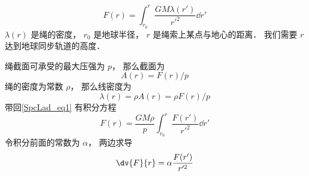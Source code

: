 
\begin{equation}\label{SpcLad_eq1}
F(r) = \int_{r_0}^{r} \frac{GM\lambda(r')}{r'^2} \dd{r'}
\end{equation}
$\lambda(r)$ 是绳的密度， $r_0$ 是地球半径， $r$ 是绳索上某点与地心的距离． 我们需要 $r$ 达到地球同步轨道的高度．

绳截面可承受的最大压强为 $p$， 那么截面为
\begin{equation}
A(r) = F(r)/p
\end{equation}
绳的密度为常数 $\rho$， 那么线密度为
\begin{equation}
\lambda(r) = \rho A(r) = \rho F(r)/p
\end{equation}
带回\autoref{SpcLad_eq1} 有积分方程
\begin{equation}
F(r) = \frac{GM\rho}{p} \int_{r_0}^{r} \frac{F(r')}{r'^2} \dd{r'}
\end{equation}
令积分前面的常数为 $\alpha$， 两边求导
\begin{equation}
\dv{F}{r} = \alpha \frac{F(r')}{r'^2}
\end{equation}
